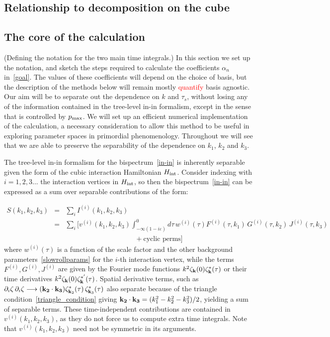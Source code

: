     \subsection{Relationship to decomposition on the cube}
    \subsection{The core of the calculation}\label{sec:main_notation}
    (Defining the notation for the two main time integrals.)
    In this section we set up the notation, and sketch the steps required to calculate the
coefficients $\alpha_n$ in~\eqref{goal}.
The values of these coefficients will depend on the choice
of basis, but the description of the methods below will remain mostly
\textcolor{red}{quantify} basis agnostic.
Our aim will be to separate out the dependence on $k$ and $\tau_s$,
without losing any of the information contained in the tree-level in-in formalism,
except in the sense that is controlled by $p_\text{max}$.
We will set up an efficient numerical implementation of the calculation,
a necessary consideration to allow this method to be useful in exploring
parameter spaces in primordial phenomenology.
Throughout we will see that we are able to preserve the
separability of the dependence on $k_1$, $k_2$ and $k_3$.


The tree-level in-in formalism for the bispectrum~\eqref{in-in} is inherently separable given
the form of the cubic interaction Hamiltonian $H_{\rm int}$.
Consider indexing with ${i=1,2,3...}$ the interaction vertices in $H_{\rm int}$,
so then the bispectrum~\eqref{in-in} can be expressed as a sum over separable contributions of the form:


\begin{eqnarray}\label{inin_sep}
S(k_1, k_2,k_3) &=& \sum_i I^{(i)} (k_1, k_2,k_3)\nonumber \\
    &=& \sum_i \bigg[ v^{(i)}(k_1, k_2,k_3) \int^0_{-\infty(1-i\varepsilon)} d\tau\, w^{(i)}(\tau) F^{(i)}(\tau,k_1)\, G^{(i)}(\tau,k_2)\,J^{(i)}(\tau,k_3)\nonumber\\
    &&\quad\quad\quad\quad\quad\quad\quad\quad\quad\quad+ \text{cyclic perms}  \bigg] 
\end{eqnarray}
where $w^{(i)}(\tau)$ is a function of the scale factor and the other background parameters~\eqref{slowrollparams} for the $i$-th interaction vertex, while the terms $F^{(i)}, G^{(i)}, J^{(i)}$ are given by the Fourier mode functions $k^2\zeta_{\bf k}(0)\zeta^{*}_{\bf k}(\tau)$ or their time derivatives $k^2\zeta_{\bf k}(0)\zeta^{*'}_{\bf k}(\tau)$.
Spatial derivative terms, such as  $\partial_i \zeta\, \partial_i\zeta \longrightarrow ({\bf k_2}\cdot {\bf k_3} )\zeta_{{\bf k}_2}^*(\tau)\, \zeta_{{\bf k}_3}^*(\tau)$ also separate because of the triangle condition~\eqref{triangle_condition} giving  ${\bf k_2}\cdot {\bf k_3} = (k_1^2 - k_2^2-k_3^2)/2$, yielding a sum of separable terms.
These time-independent contributions are contained in $v^{(i)}(k_1, k_2,k_3)$,
as they do not force us to compute extra time integrals.
Note that $v^{(i)}(k_1, k_2,k_3)$ need not be symmetric in its arguments.

